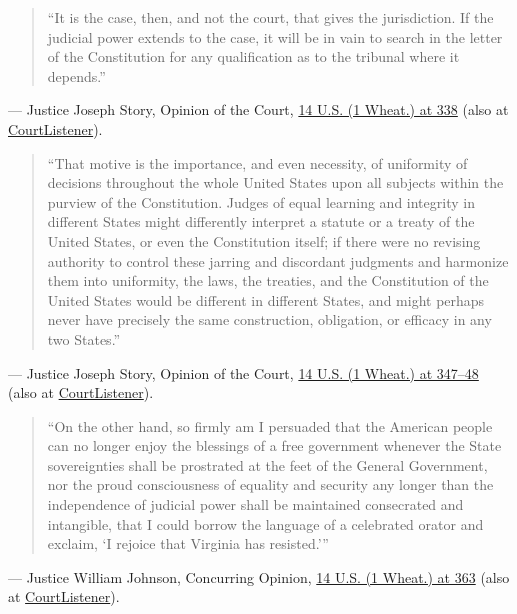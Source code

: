 \documentclass[12pt]{article}
\begin{document}
\begin{quote}
``It is the case, then, and not the court, that gives the jurisdiction. If the judicial power extends to the case, it will be in vain to search in the letter of the Constitution for any qualification as to the tribunal where it depends.''
\end{quote}
\noindent --- Justice Joseph Story, Opinion of the Court, \href{https://supreme.justia.com/cases/federal/us/14/304/}{14 U.S. (1 Wheat.) at 338} (also at \href{https://www.courtlistener.com/opinion/85160/martin-v-hunters-lessee/}{CourtListener}).

\begin{quote}
``That motive is the importance, and even necessity, of uniformity of decisions throughout the whole United States upon all subjects within the purview of the Constitution. Judges of equal learning and integrity in different States might differently interpret a statute or a treaty of the United States, or even the Constitution itself; if there were no revising authority to control these jarring and discordant judgments and harmonize them into uniformity, the laws, the treaties, and the Constitution of the United States would be different in different States, and might perhaps never have precisely the same construction, obligation, or efficacy in any two States.''
\end{quote}
\noindent --- Justice Joseph Story, Opinion of the Court, \href{https://supreme.justia.com/cases/federal/us/14/304/}{14 U.S. (1 Wheat.) at 347--48} (also at \href{https://www.courtlistener.com/opinion/85160/martin-v-hunters-lessee/}{CourtListener}).

\begin{quote}
``On the other hand, so firmly am I persuaded that the American people can no longer enjoy the blessings of a free government whenever the State sovereignties shall be prostrated at the feet of the General Government, nor the proud consciousness of equality and security any longer than the independence of judicial power shall be maintained consecrated and intangible, that I could borrow the language of a celebrated orator and exclaim, `I rejoice that Virginia has resisted.'''
\end{quote}
\noindent --- Justice William Johnson, Concurring Opinion, \href{https://supreme.justia.com/cases/federal/us/14/304/}{14 U.S. (1 Wheat.) at 363} (also at \href{https://www.courtlistener.com/opinion/85160/martin-v-hunters-lessee/}{CourtListener}).
\end{document}
